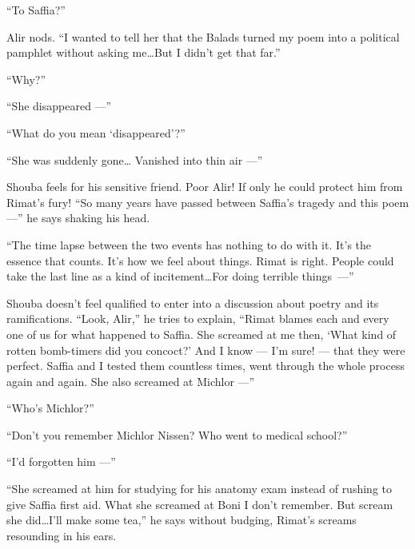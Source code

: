 \documentclass[twoside,11pt,openany]{book}
\begin{document}
``To Saffia?''

Alir nods. ``I wanted to tell her that the Balads turned my poem into a political pamphlet without asking
me{\ldots}But I didn't get that far.''

``Why?''

``She disappeared ---''

``What do you mean `disappeared'?''

``She was suddenly gone{\ldots} Vanished into thin air ---''

Shouba feels for his sensitive friend. Poor Alir! If only he could protect him from Rimat's fury! ``So many
years have passed between Saffia's tragedy and this poem ---'' he says shaking his head.

``The time lapse between the two events has nothing to do with it. It's the essence that counts. It's how
we feel about things. Rimat is right. People could take the last line as a kind of incitement{\ldots}For doing terrible
things~---''

Shouba doesn't feel qualified to enter into a discussion about poetry and its{ }ramifications.  ``Look,
Alir,'' he tries to explain, ``Rimat blames each and every one of us for what happened to
Saffia. She screamed at me then, `What kind of rotten bomb-timers did you concoct?' And I know --- I'm sure! --- that they
were perfect. Saffia and I tested them countless times, went through the whole process again and again.  She also
screamed at Michlor ---''

``Who's Michlor?''

``Don't you remember Michlor Nissen? Who went to medical school?''

``I'd forgotten him ---''

``She screamed at him for studying for his anatomy exam instead of rushing to give Saffia first aid. What
she screamed at Boni I don't remember. But scream she did{\ldots}I'll make some tea,'' he says without
budging, Rimat's screams resounding in his ears.
\end{document}
